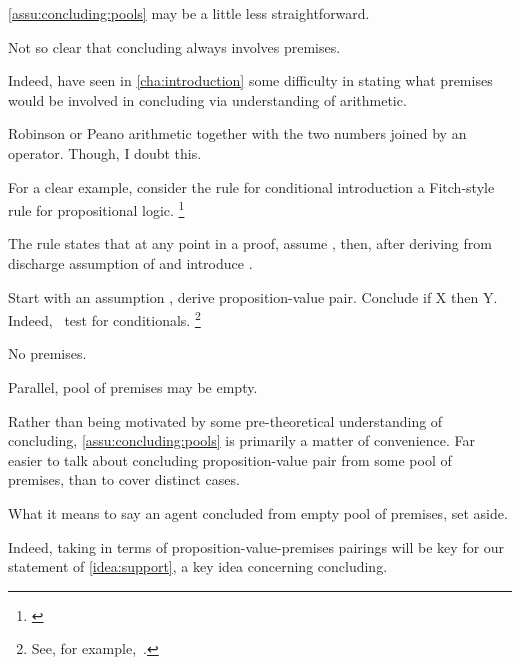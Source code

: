 \begin{note}
  \autoref{assu:concluding:pools} may be a little less straightforward.

  Not so clear that concluding always involves premises.

  Indeed, have seen in \autoref{cha:introduction} some difficulty in stating what premises would be involved in concluding via understanding of arithmetic.

    Robinson or Peano arithmetic together with the two numbers joined by an operator.
  Though, I doubt this.

  For a clear example, consider the rule for conditional introduction a Fitch-style rule for propositional logic.%
  \footnote{
    \citeauthor[cf.][206]{Barwise:1999tu}
  }

  \begin{quote}
  \end{quote}

  {
    \color{red}
    The rule states that at any point in a proof, assume , then, after deriving  from  discharge assumption of  and introduce .
  }

  Start with an assumption , derive proposition-value pair.
  Conclude if X then Y.
  Indeed,~\citeauthor{Ramsey:1929tf} test for conditionals.%
  \footnote{
    See, for example,~\textcite{Read:1995wf}.
  }

  No premises.

  Parallel, pool of premises may be empty.

  Rather than being motivated by some pre-theoretical understanding of concluding, \autoref{assu:concluding:pools} is primarily a matter of convenience.
  Far easier to talk about concluding proposition-value pair from some pool of premises, than to cover distinct cases.

  What it means to say an agent concluded from empty pool of premises, set aside.

  Indeed, taking in terms of proposition-value-premises pairings will be key for our statement of \autoref{idea:support}, a key idea concerning concluding.
\end{note}

